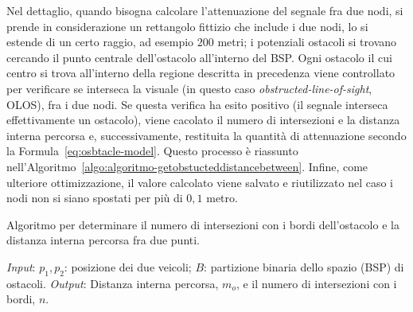 Nel dettaglio, quando bisogna calcolare l'attenuazione del segnale fra due nodi, si prende in considerazione un rettangolo fittizio che include i due nodi, lo si estende
di un certo raggio, ad esempio $200$ metri; i potenziali ostacoli si trovano cercando il punto centrale dell'ostacolo all'interno del BSP.
Ogni ostacolo il cui centro si trova all'interno della regione descritta in precedenza viene controllato per verificare se interseca la visuale
(in questo caso \textit{obstructed-line-of-sight}, OLOS), fra i due nodi.
Se questa verifica ha esito positivo (il segnale interseca effettivamente un ostacolo), viene cacolato il numero di intersezioni e la distanza interna percorsa e,
successivamente, restituita la quantità di attenuazione secondo la Formula~\ref{eq:osbtacle-model}.
Questo processo è riassunto nell'Algoritmo~\ref{algo:algoritmo-getobstucteddistancebetween}.
Infine, come ulteriore ottimizzazione, il valore calcolato viene salvato e riutilizzato nel caso i nodi non si siano spostati per più di $0,1$ metro.
%
\begin{italianalgorithm}[h]
\caption{Algoritmo per determinare il numero di intersezioni con i bordi dell'ostacolo e la distanza interna percorsa fra due punti.}\label{algo:algoritmo-getobstucteddistancebetween}
\begin{algorithmic}[1]
	\BState{}\emph{Input}: $p_1, p_2$: posizione dei due veicoli; $B$: partizione binaria dello spazio (BSP) di ostacoli.
	\BState{}\emph{Output}: Distanza interna percorsa, $m_o$, e il numero di intersezioni con i bordi, $n$.
			\label{algo:line:getobstucteddistancebetween-interesezione}
				\EndIf{}
			\EndFor{}
		\EndIf{}
	\EndFor{}
	\EndProcedure{}
\end{algorithmic}
\end{italianalgorithm}
